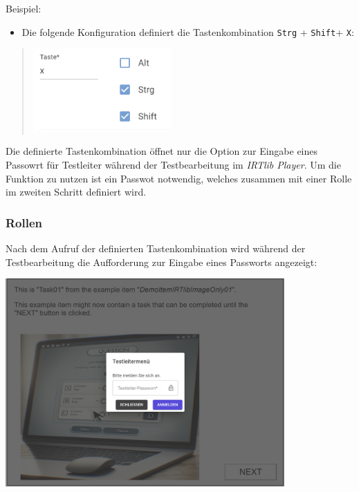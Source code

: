 \documentclass[
  letterpaper,
  DIV=11]{scrreprt}
\providecommand{\tightlist}{%
  \setlength{\itemsep}{0pt}\setlength{\parskip}{0pt}}\usepackage{longtable,booktabs,array}
\begin{document}
\begin{tcolorbox}
Beispiel:

\begin{itemize}
\tightlist
\item
  Die folgende Konfiguration definiert die Tastenkombination
  \texttt{Strg} + \texttt{Shift}+ \texttt{X}:
\end{itemize}

\begin{quote}
\includegraphics[width=2.08333in,height=\textheight]{img/screenshot-test-adminstrator-strg-shift-x-example-01.png}
\end{quote}

Die definierte Tastenkombination öffnet nur die Option zur Eingabe eines
Passowrt für Testleiter während der Testbearbeitung im \emph{IRTlib
Player}. Um die Funktion zu nutzen ist ein Passwot notwendig, welches
zusammen mit einer Rolle im zweiten Schritt definiert wird.

\hypertarget{rollen-1}{%
\subsubsection{Rollen}\label{rollen-1}}

Nach dem Aufruf der definierten Tastenkombination wird während der
Testbearbeitung die Aufforderung zur Eingabe eines Passworts angezeigt:

\includegraphics[width=0.8\textwidth,height=\textheight]{img/screenshot-test-adminstrator-menue-password-example-01-DEU.png}


\end{tcolorbox}
\end{document}

